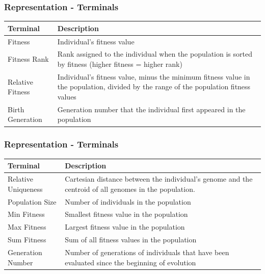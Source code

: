 \documentclass{beamer}
\begin{document}
	\begin{frame}
		\frametitle{Representation - Terminals}
		
		\begin{table}
		\centering
		  \label{tab:gp-terminals1}
		  \begin{tabular}{p{3.5cm}|p{6.5cm}}
		  \hline
		    \textbf{Terminal} & \textbf{Description}\\
		    \hline
		    Fitness &  Individual's fitness value \\
		    \hline
		    Fitness Rank &  Rank assigned to the individual when the population is sorted by fitness (higher fitness = higher rank) \\    
		    \hline
		    Relative Fitness &  Individual's fitness value, minus the minimum fitness value in the population, divided by the range of the population fitness values \\
		    \hline
		    Birth Generation &  Generation number that the individual first appeared in the population \\  
		    \hline             
		    
		\end{tabular}
		\end{table}		
	\end{frame}
	
	\begin{frame}
		\frametitle{Representation - Terminals}
		
		\begin{table}
		\centering
		  \label{tab:gp-terminals2}
		  \begin{tabular}{p{3.5cm}|p{6.5cm}}
		  \hline
		    \textbf{Terminal} & \textbf{Description}\\
		    \hline
		    Relative Uniqueness &  Cartesian distance between the individual's genome and the centroid of all genomes in the population. \\  
		    \hline		    
		    Population Size &  Number of individuals in the population \\
		    \hline
		    Min Fitness &  Smallest fitness value in the population \\
		    \hline
		    Max Fitness &  Largest fitness value in the population \\ 
		    \hline
		    Sum Fitness &  Sum of all fitness values in the population \\
		    \hline
		    Generation Number &  Number of generations of individuals that have been evaluated since the beginning of evolution \\  
		    \hline            
		    
		\end{tabular}
		\end{table}		
	\end{frame}	
	
\end{document}
